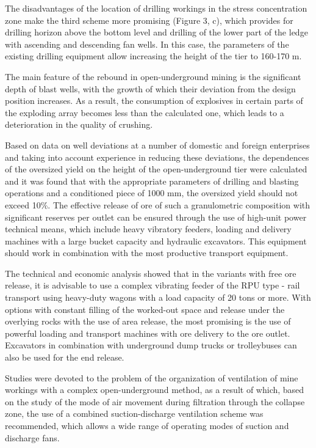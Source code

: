 \begin{multicols}{2}
The disadvantages of the location of drilling workings in the stress
concentration zone make the third scheme more promising (Figure 3, c),
which provides for drilling horizon above the bottom level and drilling
of the lower part of the ledge with ascending and descending fan wells.
In this case, the parameters of the existing drilling equipment allow
increasing the height of the tier to 160-170 m.

The main feature of the rebound in open-underground mining is the
significant depth of blast wells, with the growth of which their
deviation from the design position increases. As a result, the
consumption of explosives in certain parts of the exploding array
becomes less than the calculated one, which leads to a deterioration in
the quality of crushing.

Based on data on well deviations at a number of domestic and foreign
enterprises and taking into account experience in reducing these
deviations, the dependences of the oversized yield on the height of the
open-underground tier were calculated and it was found that with the
appropriate parameters of drilling and blasting operations and a
conditioned piece of 1000 mm, the oversized yield should not exceed
10\%. The effective release of ore of such a granulometric composition
with significant reserves per outlet can be ensured through the use of
high-unit power technical means, which include heavy vibratory feeders,
loading and delivery machines with a large bucket capacity and hydraulic
excavators. This equipment should work in combination with the most
productive transport equipment.

The technical and economic analysis showed that in the variants with
free ore release, it is advisable to use a complex vibrating feeder of
the RPU type - rail transport using heavy-duty wagons with a load
capacity of 20 tons or more. With options with constant filling of the
worked-out space and release under the overlying rocks with the use of
area release, the most promising is the use of powerful loading and
transport machines with ore delivery to the ore outlet. Excavators in
combination with underground dump trucks or trolleybuses can also be
used for the end release.

Studies were devoted to the problem of the organization of ventilation
of mine workings with a complex open-underground method, as a result of
which, based on the study of the mode of air movement during filtration
through the collapse zone, the use of a combined suction-discharge
ventilation scheme was recommended, which allows a wide range of
operating modes of suction and discharge fans.


\end{multicols}
